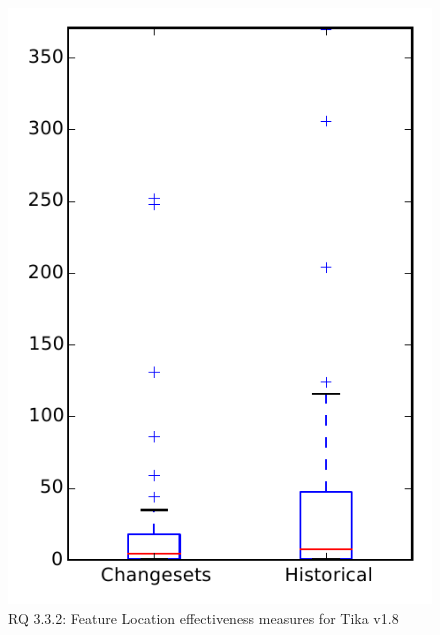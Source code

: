 
\begin{figure}
\centering
\includegraphics[height=0.4\textheight]{figures/flt/rq2_tika}
\caption{RQ 3.3.2: Feature Location effectiveness measures for Tika v1.8}
\label{fig:flt:rq2:tika}
\end{figure}
